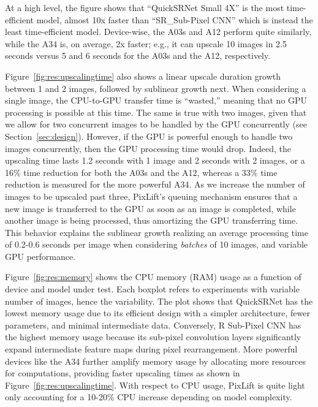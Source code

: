 \documentclass[acmsmall]{acmart}
\newcommand{\tool}{{PixLift}\xspace}
\newcommand{\eg}{{e.g.,}\xspace}
\begin{document}
At a high level, the figure shows that ``QuickSRNet Small 4X'' is the most time-efficient model, almost 10x faster than ``SR\_Sub-Pixel CNN'' which is instead the least time-efficient model. Device-wise, the A03s and A12 perform quite similarly, while the A34 is, on average, 2x faster; \eg it can upscale 10 images in 2.5 seconds versus 5 and 6 seconds for the A03s and the A12, respectively. 

Figure~\ref{fig:res:upscalingtime} also shows a linear upscale duration growth between 1 and 2 images, followed by sublinear growth next. When considering a single image, the CPU-to-GPU transfer time is ``wasted,'' meaning that no GPU processing is possible at this time. The same is true with two images, given that we allow for two concurrent images to be handled by the GPU concurrently (see Section~\ref{sec:design}). However, if the GPU is powerful enough to handle two images concurrently, then the GPU processing time would drop. Indeed, the upscaling time lasts 1.2 seconds with 1 image and 2 seconds with 2 images, or a 16\% time reduction for both the A03s and the A12, whereas a 33\% time reduction is measured for the more powerful A34. As we increase the number of images to be upscaled past three, \tool's queuing mechanism ensures that a new image is transferred to the GPU as soon as an image is completed, while another image is being processed, thus amortizing the GPU transferring time. This behavior explains the sublinear growth realizing an average processing time of 0.2-0.6 seconds per image when considering \textit{batches} of 10 images, and variable GPU performance.

Figure~\ref{fig:res:memory} shows the CPU memory (RAM) usage as a function of device and model under test. Each boxplot refers to experiments with variable number of images, hence the variability. The plot shows that QuickSRNet has the lowest memory usage due to its efficient design with a simpler architecture, fewer parameters, and minimal intermediate data. Conversely, R Sub-Pixel CNN has the highest memory usage because its sub-pixel convolution layers significantly expand intermediate feature maps during pixel rearrangement. More powerful devices like the A34 further amplify memory usage by allocating more resources for computations, providing faster upscaling times as shown in Figure~\ref{fig:res:upscalingtime}. With respect to CPU usage, \tool is quite light only accounting for a 10-20\% CPU increase depending on model complexity. 
\end{document}
